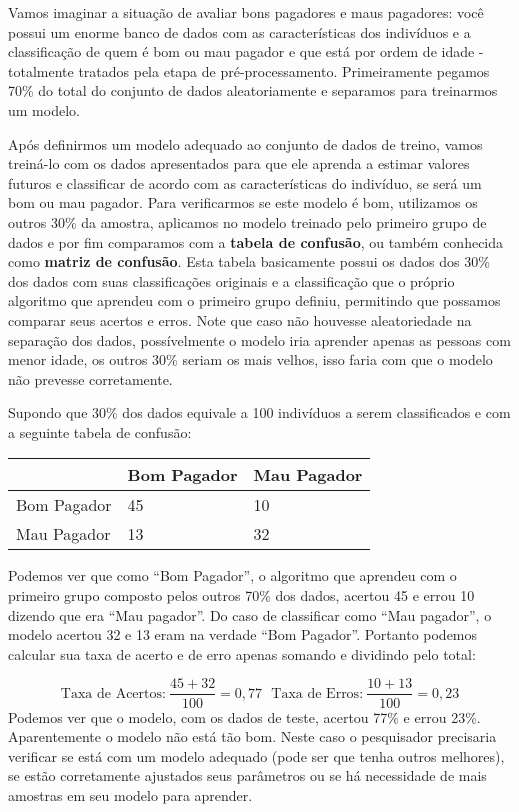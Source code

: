 \documentclass[
  openany]{book}
\begin{document}
Vamos imaginar a situação de avaliar bons pagadores e maus pagadores: você possui um enorme banco de dados com as características dos indivíduos e a classificação de quem é bom ou mau pagador e que está por ordem de idade - totalmente tratados pela etapa de pré-processamento. Primeiramente pegamos 70\% do total do conjunto de dados aleatoriamente e separamos para treinarmos um modelo.

Após definirmos um modelo adequado ao conjunto de dados de treino, vamos treiná-lo com os dados apresentados para que ele aprenda a estimar valores futuros e classificar de acordo com as características do indivíduo, se será um bom ou mau pagador. Para verificarmos se este modelo é bom, utilizamos os outros 30\% da amostra, aplicamos no modelo treinado pelo primeiro grupo de dados e por fim comparamos com a \textbf{tabela de confusão}, ou também conhecida como \textbf{matriz de confusão}. Esta tabela basicamente possui os dados dos 30\% dos dados com suas classificações originais e a classificação que o próprio algoritmo que aprendeu com o primeiro grupo definiu, permitindo que possamos comparar seus acertos e erros. Note que caso não houvesse aleatoriedade na separação dos dados, possívelmente o modelo iria aprender apenas as pessoas com menor idade, os outros 30\% seriam os mais velhos, isso faria com que o modelo não prevesse corretamente.

Supondo que 30\% dos dados equivale a 100 indivíduos a serem classificados e com a seguinte tabela de confusão:

\begin{longtable}[]{@{}lll@{}}
\toprule
& Bom Pagador & Mau Pagador\tabularnewline
\midrule
\endhead
Bom Pagador & 45 & 10\tabularnewline
Mau Pagador & 13 & 32\tabularnewline
\bottomrule
\end{longtable}

Podemos ver que como ``Bom Pagador'', o algoritmo que aprendeu com o primeiro grupo composto pelos outros 70\% dos dados, acertou 45 e errou 10 dizendo que era ``Mau pagador''. Do caso de classificar como ``Mau pagador'', o modelo acertou 32 e 13 eram na verdade ``Bom Pagador''. Portanto podemos calcular sua taxa de acerto e de erro apenas somando e dividindo pelo total:

\[\mbox{Taxa de Acertos:}\ \frac{45+32}{100}=0,77 \ \ \ \mbox{Taxa de Erros:}\ \frac{10+13}{100}=0,23\]
Podemos ver que o modelo, com os dados de teste, acertou 77\% e errou 23\%. Aparentemente o modelo não está tão bom. Neste caso o pesquisador precisaria verificar se está com um modelo adequado (pode ser que tenha outros melhores), se estão corretamente ajustados seus parâmetros ou se há necessidade de mais amostras em seu modelo para aprender.
\end{document}
